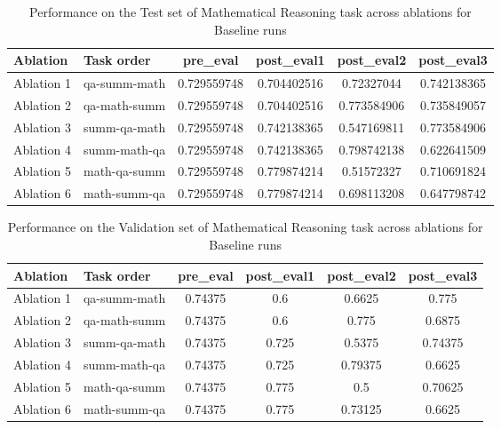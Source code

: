 \begin{table}[!ht]
    \centering
    \caption{Performance on the Test set of Mathematical Reasoning task across ablations for Baseline runs}
    \begin{tabular}{|l|l|S[table-format=2.4]|S[table-format=2.4]|S[table-format=2.4]|S[table-format=2.4]|}
    \hline
        \textbf{Ablation} & \textbf{Task order} & \textbf{pre\_eval} & \textbf{post\_eval1} & \textbf{post\_eval2} & \textbf{post\_eval3 } \\ \hline
        Ablation 1 & qa-summ-math & 0.729559748 & 0.704402516 & 0.72327044 & 0.742138365  \\ 
        Ablation 2 & qa-math-summ & 0.729559748 & 0.704402516 & 0.773584906 & 0.735849057  \\ 
        Ablation 3 & summ-qa-math & 0.729559748 & 0.742138365 & 0.547169811 & 0.773584906  \\ 
        Ablation 4 & summ-math-qa & 0.729559748 & 0.742138365 & 0.798742138 & 0.622641509  \\ 
        Ablation 5 & math-qa-summ & 0.729559748 & 0.779874214 & 0.51572327 & 0.710691824  \\ 
        Ablation 6 & math-summ-qa & 0.729559748 & 0.779874214 & 0.698113208 & 0.647798742  \\ \hline
    \end{tabular}
    \label{tab:MathTestBaseline}
\end{table}

\begin{table}[!ht]
    \centering
    \caption{Performance on the Validation set of Mathematical Reasoning task across ablations for Baseline runs}
    \begin{tabular}{|l|l|S[table-format=2.4]|S[table-format=2.4]|S[table-format=2.4]|S[table-format=2.4]|}
    \hline
        \textbf{Ablation} & \textbf{Task order} & \textbf{pre\_eval} & \textbf{post\_eval1} & \textbf{post\_eval2} & \textbf{post\_eval3 } \\ \hline
        Ablation 1 & qa-summ-math & 0.74375 & 0.6 & 0.6625 & 0.775  \\ 
        Ablation 2 & qa-math-summ & 0.74375 & 0.6 & 0.775 & 0.6875  \\ 
        Ablation 3 & summ-qa-math & 0.74375 & 0.725 & 0.5375 & 0.74375  \\ 
        Ablation 4 & summ-math-qa & 0.74375 & 0.725 & 0.79375 & 0.6625  \\ 
        Ablation 5 & math-qa-summ & 0.74375 & 0.775 & 0.5 & 0.70625  \\ 
        Ablation 6 & math-summ-qa & 0.74375 & 0.775 & 0.73125 & 0.6625  \\ \hline
    \end{tabular}
    \label{tab:MathValBaseline}
\end{table}